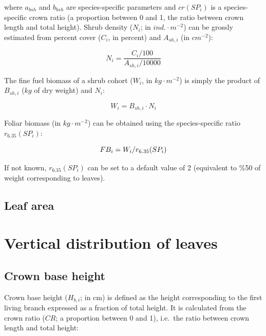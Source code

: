 \documentclass[]{book}
\begin{document}
where \(a_{bsh}\) and \(b_{bsh}\) are species-specific parameters and
\(cr(SP_i)\) is a species-specific crown ratio (a proportion between 0
and 1, the ratio between crown length and total height). Shrub density
(\(N_{i}\); in \(ind.\cdot m^{-2}\)) can be grossly estimated from
percent cover (\(C_{i}\), in percent) and \(A_{sh,i}\) (in \(cm^{-2}\)):

\begin{equation}
N_{i} = \frac{C_{i}/100}{A_{sh,i}/10000}
\end{equation}

The fine fuel biomass of a shrub cohort (\(W_{i}\), in
\(kg \cdot m^{-2}\)) is simply the product of \(B_{sh,i}\) (\(kg\) of
dry weight) and \(N_{i}\):

\begin{equation}
W_{i} =  B_{sh,i}\cdot N_{i}
\label{eq:shrubloading}
\end{equation}

Foliar biomass (in \(kg \cdot m^{-2}\)) can be obtained using the
species-specific ratio \(r_{6.35}(SP_i)\):

\begin{equation}
FB_{i} =  W_{i}/r_{6.35}(SP_i)\\
\label{eq:shrubfoliarbiomass}
\end{equation}

If not known, \(r_{6.35}(SP_i)\) can be set to a default value of 2
(equivalent to \%50 of weight corresponding to leaves).

\subsection{Leaf area}\label{leaf-area}

\section{Vertical distribution of
leaves}\label{vertical-distribution-of-leaves}

\subsection{Crown base height}\label{crownbaseheight}

Crown base height (\(H_{b,i}\); in cm) is defined as the height
corresponding to the first living branch expressed as a fraction of
total height. It is calculated from the crown ratio (\(CR\); a
proportion between 0 and 1), i.e.~the ratio between crown length and
total height:
\end{document}
